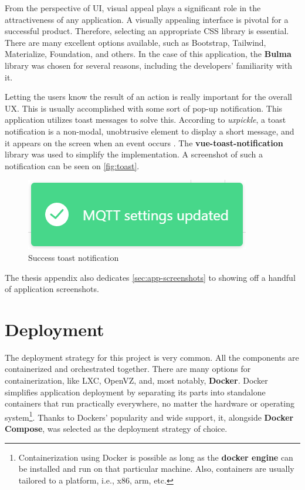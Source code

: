 \documentclass[FM,BP,EN,fonts]{tulthesis}
\begin{document}
From the perspective of UI, visual appeal plays a significant role in the attractiveness of any application. A visually appealing interface is pivotal for a successful product. Therefore, selecting an appropriate CSS library is essential. There are many excellent options available, such as Bootstrap, Tailwind, Materialize, Foundation, and others. In the case of this application, the \textbf{Bulma} library was chosen for several reasons, including the developers' familiarity with it.

Letting the users know the result of an action is really important for the overall UX. This is usually accomplished with some sort of pop-up notification. This application utilizes toast messages to solve this. According to \textit{uxpickle}, a toast notification is a non-modal, unobtrusive element to display a short message, and it appears on the screen when an event occurs \cite{toast-msg}. The \textbf{vue-toast-notification} library was used to simplify the implementation. A screenshot of such a notification can be seen on \autoref{fig:toast}.

\begin{figure}[H]
    \centering
    \includegraphics[scale=.75]{media/toast.png}
    \caption{Success toast notification}
    \label{fig:toast}
\end{figure}

The thesis appendix also dedicates \autoref{sec:app-screenshots} to showing off a handful of application screenshots.

\section{Deployment}
\label{sec:deployment}
The deployment strategy for this project is very common. All the components are containerized and orchestrated together. There are many options for containerization, like LXC, OpenVZ, and, most notably, \textbf{Docker}. Docker simplifies application deployment by separating its parts into standalone containers that run practically everywhere, no matter the hardware or operating system\footnote{Containerization using Docker is possible as long as the \textbf{docker engine} can be installed and run on that particular machine. Also, containers are usually tailored to a platform, i.e., x86, arm, etc.}. Thanks to Dockers' popularity and wide support, it, alongside \textbf{Docker Compose}, was selected as the deployment strategy of choice.
\end{document}
